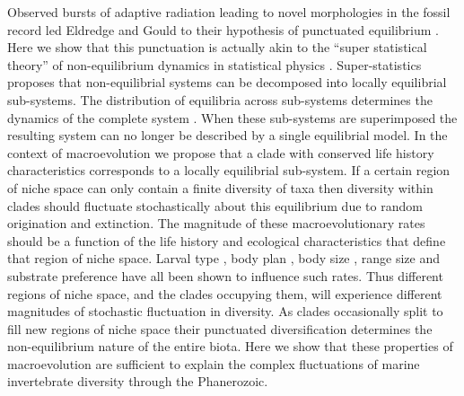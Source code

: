 \documentclass[11pt]{article}
\begin{document}
Observed bursts of adaptive radiation leading to novel morphologies in
the fossil record led Eldredge and Gould to their hypothesis of
punctuated equilibrium \citep{eldredgeGould1972}. Here we show that
this punctuation is actually akin to the ``super statistical theory''
of non-equilibrium dynamics in statistical physics
\citep{beck2003}. Super-statistics \citep{beck2003} proposes that
non-equilibrial systems can be decomposed into locally equilibrial
sub-systems. The distribution of equilibria across sub-systems
determines the dynamics of the complete system \citep{beck2003}. When
these sub-systems are superimposed the resulting system can no longer
be described by a single equilibrial model. In the context of
macroevolution we propose that a clade with conserved life history
characteristics corresponds to a locally equilibrial sub-system. If a
certain region of niche space can only contain a finite diversity of
taxa \citep{simpson1953, gavrilets2005, rabosky2009ecolLett, price2014}
then diversity within clades should fluctuate stochastically about
this equilibrium due to random origination and extinction. The
magnitude of these macroevolutionary rates should be a function of the
life history and ecological characteristics that define that region of
niche space. Larval type \citep{jablonski2008}, body plan
\citep{erwin2012}, body size \citep{harnik2011}, range size
\citep{harnik2011, foote2008paleobiol} and substrate preference
\citep{hopkins2014} have all been shown to influence such rates. Thus
different regions of niche space, and the clades occupying them, will
experience different magnitudes of stochastic fluctuation in
diversity. As clades occasionally split to fill new regions of niche
space their punctuated diversification determines the non-equilibrium
nature of the entire biota. Here we show that these properties of
macroevolution are sufficient to explain the complex fluctuations of
marine invertebrate diversity through the Phanerozoic.
\end{document}
